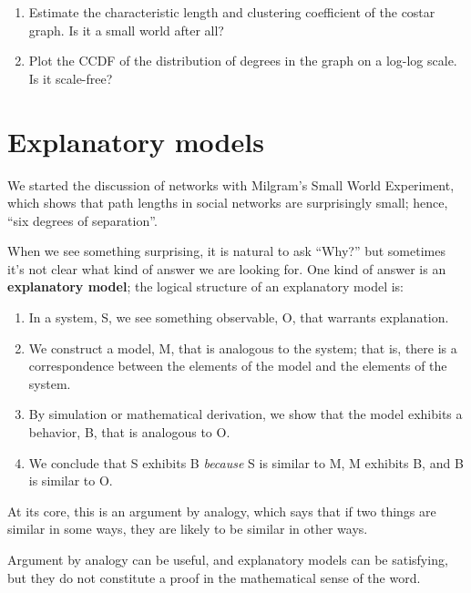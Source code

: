 \documentclass[10pt]{book}
\begin{document}
\begin{ex}
\begin{enumerate}
\item Estimate the characteristic length and clustering coefficient of
  the costar graph.  Is it a small world after all?

\item Plot the CCDF of the distribution of degrees in the graph on a
  log-log scale.  Is it scale-free?

\end{enumerate}

\end{ex}


\section{Explanatory models}

We started the discussion of networks with Milgram's Small World
Experiment, which shows that path lengths in social
networks are surprisingly small; hence, ``six degrees of separation''.

When we see something surprising, it is natural to ask ``Why?''
but sometimes it's not clear what kind of answer we are looking
for.  One kind of answer is an {\bf explanatory model}; the logical
structure of an explanatory model is:

\begin{enumerate}

\item In a system, S, we see something observable, O, that warrants
  explanation.

\item We construct a model, M, that is analogous to the system; that
  is, there is a correspondence between the elements of the model and
  the elements of the system.

\item By simulation or mathematical derivation, we show that the model
  exhibits a behavior, B, that is analogous to O.

\item We conclude that S exhibits B {\em because} S is similar to M, M
  exhibits B, and B is similar to O.

\end{enumerate}

At its core, this is an argument by analogy, which says that if two
things are similar in some ways, they are likely to be similar in
other ways.  

Argument by analogy can be useful, and explanatory models can be
satisfying, but they do not constitute a proof in the mathematical
sense of the word.
\end{document}
